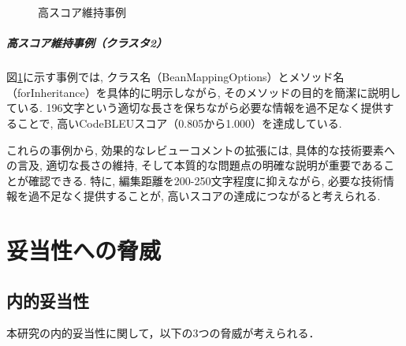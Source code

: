\documentclass[11pt]{jreport}
\begin{document}
\begin{figure}[h]
   \centering
   \caption{高スコア維持事例}
   \label{fig:high-score-case}
\end{figure}

\paragraph{高スコア維持事例（クラスタ2）}
図\ref{fig:high-score-case}に示す事例では, クラス名（BeanMappingOptions）とメソッド名（forInheritance）を具体的に明示しながら, そのメソッドの目的を簡潔に説明している. 196文字という適切な長さを保ちながら必要な情報を過不足なく提供することで, 高いCodeBLEUスコア（0.805から1.000）を達成している.

これらの事例から, 効果的なレビューコメントの拡張には, 具体的な技術要素への言及, 適切な長さの維持, そして本質的な問題点の明確な説明が重要であることが確認できる. 特に, 編集距離を200-250文字程度に抑えながら, 必要な技術情報を過不足なく提供することが, 高いスコアの達成につながると考えられる.

\chapter{妥当性への脅威}\label{chap:fig-tab-exp}

\section{内的妥当性}

本研究の内的妥当性に関して，以下の3つの脅威が考えられる．
\end{document}
